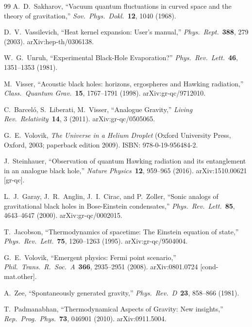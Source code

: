 \documentclass[11pt,a4paper]{article}
\theoremstyle{definition}
\begin{document}
\begin{thebibliography}{99}
A.~D.~Sakharov, ``Vacuum quantum fluctuations in curved space and the theory of gravitation,'' \emph{Sov.\ Phys.\ Dokl.}\ \textbf{12}, 1040 (1968).

D.~V.~Vassilevich, ``Heat kernel expansion: User's manual,'' \emph{Phys.\ Rept.}\ \textbf{388}, 279 (2003). arXiv:hep-th/0306138.

W.~G.~Unruh, ``Experimental Black-Hole Evaporation?'' \emph{Phys.\ Rev.\ Lett.}\ \textbf{46}, 1351--1353 (1981).

M.~Visser, ``Acoustic black holes: horizons, ergospheres and Hawking radiation,'' \emph{Class.\ Quantum Grav.}\ \textbf{15}, 1767--1791 (1998). arXiv:gr-qc/9712010.

C.~Barceló, S.~Liberati, M.~Visser, ``Analogue Gravity,'' \emph{Living Rev.\ Relativity}\ \textbf{14}, 3 (2011). arXiv:gr-qc/0505065.

G.~E.~Volovik, \emph{The Universe in a Helium Droplet} (Oxford University Press, Oxford, 2003; paperback edition 2009). ISBN: 978-0-19-956484-2.

J.~Steinhauer, ``Observation of quantum Hawking radiation and its entanglement in an analogue black hole,'' \emph{Nature Physics}\ \textbf{12}, 959--965 (2016). arXiv:1510.00621 [gr-qc].

L.~J.~Garay, J.~R.~Anglin, J.~I.~Cirac, and P.~Zoller, ``Sonic analogs of gravitational black holes in Bose-Einstein condensates,'' \emph{Phys.\ Rev.\ Lett.}\ \textbf{85}, 4643--4647 (2000). arXiv:gr-qc/0002015.

T.~Jacobson, ``Thermodynamics of spacetime: The Einstein equation of state,'' \emph{Phys.\ Rev.\ Lett.}\ \textbf{75}, 1260--1263 (1995). arXiv:gr-qc/9504004.

G.~E.~Volovik, ``Emergent physics: Fermi point scenario,'' \emph{Phil.\ Trans.\ R.\ Soc.\ A}\ \textbf{366}, 2935--2951 (2008). arXiv:0801.0724 [cond-mat.other].

A.~Zee, ``Spontaneously generated gravity,'' \emph{Phys.\ Rev.\ D}\ \textbf{23}, 858--866 (1981).

T.~Padmanabhan, ``Thermodynamical Aspects of Gravity: New insights,'' \emph{Rep.\ Prog.\ Phys.}\ \textbf{73}, 046901 (2010). arXiv:0911.5004.


\end{thebibliography}
\end{document}
